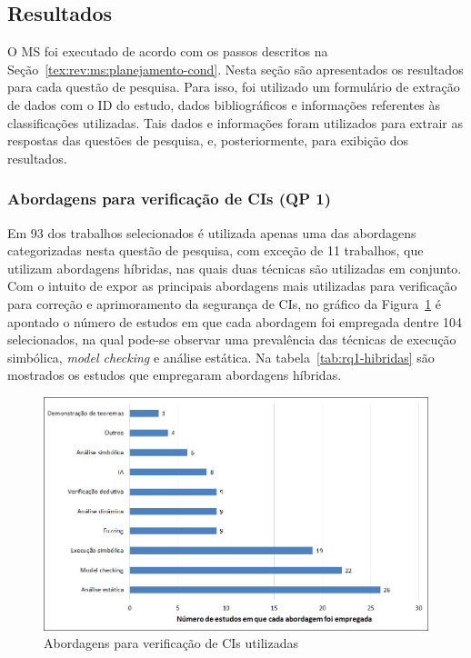 

\subsection{Resultados}\label{tex:rev:ms:publicacao}

O MS foi executado de acordo com os passos descritos na Seção~\ref{tex:rev:ms:planejamento-cond}. Nesta seção são apresentados os resultados para cada questão de pesquisa. Para isso, foi utilizado um formulário de extração de dados com o ID do estudo, dados bibliográficos e informações referentes às classificações utilizadas. Tais dados e informações foram utilizados para extrair as respostas das questões de pesquisa, e, posteriormente, para exibição dos resultados.

\subsubsection*{\textbf{Abordagens para verificação de CIs (QP 1)}}


Em 93 dos trabalhos selecionados é utilizada apenas uma das abordagens categorizadas nesta questão de pesquisa, com exceção de 11 trabalhos, que utilizam abordagens híbridas, nas quais duas técnicas são utilizadas em conjunto. Com o intuito de expor as principais abordagens mais utilizadas para verificação para correção e aprimoramento da segurança de CIs, no gráfico da Figura~\ref{fig:rq1-abordagens} é apontado o número de estudos em que cada abordagem foi empregada dentre 104 selecionados, na qual pode-se observar uma prevalência das técnicas de execução simbólica, \textit{model checking} e análise estática. Na tabela~\ref{tab:rq1-hibridas} são mostrados os estudos que empregaram abordagens híbridas.

\begin{figure}[!htb]
 \caption{Abordagens para verificação de CIs utilizadas}
 \label{fig:rq1-abordagens}
 \centering
 \includegraphics[scale=0.6]{figuras/rq1-abordagens.png}
 \fdadospesquisa
\end{figure}

